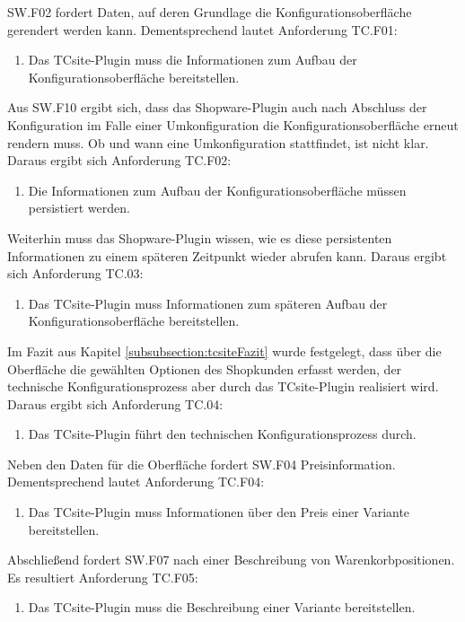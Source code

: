 \documentclass[11pt, a4paper, titlepage, listof=totoc, bibliography=totoc, index=totoc, twoside, openright, headings=normal]{scrreprt}
\begin{document}
SW.F02 fordert Daten, auf deren Grundlage die Konfigurationsoberfläche gerendert werden kann. Dementsprechend lautet Anforderung TC.F01:
\begin{enumerate}[TC.F01:]\bfseries
\item Das TCsite-Plugin muss die Informationen zum Aufbau der Konfigurationsoberfläche bereitstellen.
\end{enumerate}
Aus SW.F10 ergibt sich, dass das Shopware-Plugin auch nach Abschluss der Konfiguration im Falle einer Umkonfiguration die Konfigurationsoberfläche erneut rendern muss. Ob und wann eine Umkonfiguration stattfindet, ist nicht klar. Daraus ergibt sich Anforderung TC.F02:
\begin{enumerate}[TC.F02:]\bfseries
\item Die Informationen zum Aufbau der Konfigurationsoberfläche müssen persistiert werden.
\end{enumerate}
Weiterhin muss das Shopware-Plugin wissen, wie es diese persistenten Informationen zu einem späteren Zeitpunkt wieder abrufen kann. Daraus ergibt sich Anforderung TC.03:
\begin{enumerate}[TC.F03:]\bfseries
\item Das TCsite-Plugin muss Informationen zum späteren Aufbau der Konfigurationsoberfläche bereitstellen.
\end{enumerate}
Im Fazit aus Kapitel \ref{subsubsection:tcsiteFazit} wurde festgelegt, dass über die Oberfläche die gewählten Optionen des Shopkunden erfasst werden, der technische Konfigurationsprozess aber durch das TCsite-Plugin realisiert wird. Daraus ergibt sich Anforderung TC.04:
\begin{enumerate}[TC.F04:]\bfseries
\item Das TCsite-Plugin führt den technischen Konfigurationsprozess durch.
\end{enumerate}
Neben den Daten für die Oberfläche fordert SW.F04 Preisinformation. Dementsprechend lautet Anforderung TC.F04:
\begin{enumerate}[TC.F04:]\bfseries
\item Das TCsite-Plugin muss Informationen über den Preis einer Variante bereitstellen.
\end{enumerate}
Abschließend fordert SW.F07 nach einer Beschreibung von Warenkorbpositionen. Es resultiert Anforderung TC.F05:
\begin{enumerate}[TC.F05:]\bfseries
\item Das TCsite-Plugin muss die Beschreibung einer Variante bereitstellen.
\end{enumerate}
\end{document}
